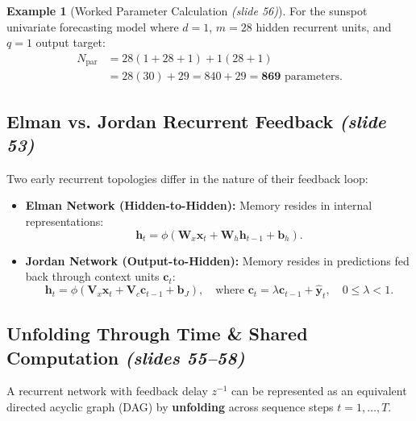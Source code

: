 \documentclass[11pt,a4paper]{article}
\theoremstyle{definition}
\newtheorem{example}{Example}[section]
\theoremstyle{plain}
\begin{document}
\begin{example}[Worked Parameter Calculation \emph{(slide 56)}]
For the sunspot univariate forecasting model where $d = 1$, $m = 28$ hidden recurrent units, and $q = 1$ output target:
\begin{align*}
    N_{\text{par}} &= 28(1 + 28 + 1) + 1(28 + 1) \\
    &= 28(30) + 29 = 840 + 29 = \mathbf{869} \text{ parameters}.
\end{align*}
\end{example}

\subsection{Elman vs. Jordan Recurrent Feedback \emph{(slide 53)}}
Two early recurrent topologies differ in the nature of their feedback loop:
\begin{itemize}
    \item \textbf{Elman Network (Hidden-to-Hidden):} Memory resides in internal representations:
    \begin{equation}
        \mathbf{h}_t = \phi(\mathbf{W}_x \mathbf{x}_t + \mathbf{W}_h \mathbf{h}_{t-1} + \mathbf{b}_h).
    \end{equation}
    \item \textbf{Jordan Network (Output-to-Hidden):} Memory resides in predictions fed back through context units $\mathbf{c}_t$:
    \begin{equation}
        \mathbf{h}_t = \phi(\mathbf{V}_x \mathbf{x}_t + \mathbf{V}_c \mathbf{c}_{t-1} + \mathbf{b}_J), \quad \text{where } \mathbf{c}_t = \lambda \mathbf{c}_{t-1} + \hat{\mathbf{y}}_t, \quad 0 \le \lambda < 1.
    \end{equation}
\end{itemize}

\subsection{Unfolding Through Time \& Shared Computation \emph{(slides 55--58)}}
A recurrent network with feedback delay $z^{-1}$ can be represented as an equivalent directed acyclic graph (DAG) by \textbf{unfolding} across sequence steps $t = 1, \dots, T$.
\end{document}
